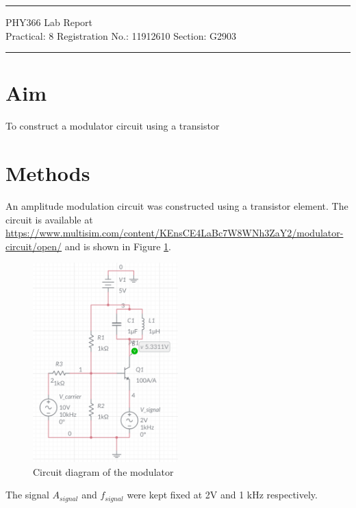 \documentclass{article}
\begin{document}
	
	\author{Aayush Arya}
	\date{(Submitted: \today)}
	\title{}
	
	\maketitle
	
	\hrule
	\begin{center}
		PHY366 Lab Report\\
		Practical: 8 \quad Registration No.: 11912610 \quad Section: G2903
	\end{center}
	\hrule
	
	\section*{Aim}
	To construct a modulator circuit using a transistor
	
	\section*{Methods}
	
	An amplitude modulation circuit was constructed using a transistor element. The circuit is available at \url{https://www.multisim.com/content/KEnsCE4LaBc7W8WNh3ZaY2/modulator-circuit/open/} and is shown in Figure \ref{fig:circuit}.
	
	\begin{figure}[!h]
		\centering
		\includegraphics[width=0.5\textwidth]{circuit}
		\caption{Circuit diagram of the modulator}
		\label{fig:circuit}
	\end{figure}

	The signal $A_{signal}$ and $f_{signal}$ were kept fixed at 2V and 1 kHz respectively.
	
\end{document}
